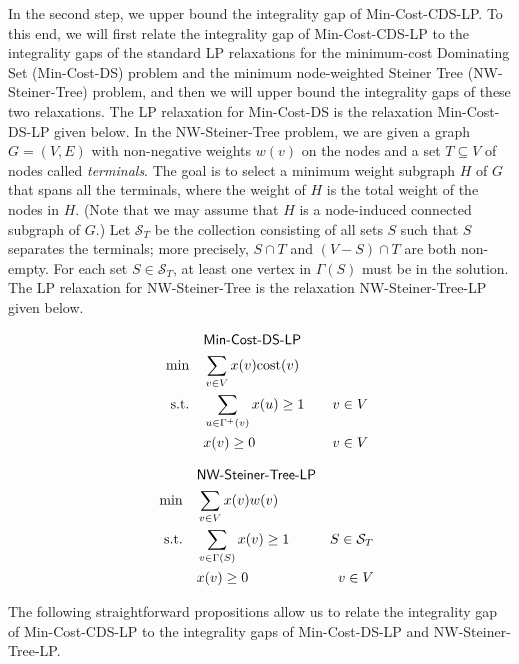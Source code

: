 \documentclass[11pt]{article}
\def\script#1{\mathcal{#1}}
\def\sS{\script{S}}
\def\prob#1{\textsf{\textup{#1}}\xspace}
\def\minDSlp{\prob{\minDS-LP}}
\def\minCDSlp{\prob{\minCDS-LP}}
\def\nwST{\prob{NW-Steiner-Tree}}
\def\nwSTlp{\prob{\nwST-LP}}
\def\minCDS{\prob{Min-Cost-CDS}}
\def\minDS{\prob{Min-Cost-DS}}
\def\cost{\mathrm{cost}}
\begin{document}
\medskip\noindent
In the second step, we upper bound the integrality gap of \minCDSlp.
To this end, we will first relate the integrality gap of \minCDSlp to
the integrality gaps of the standard LP relaxations for the
minimum-cost \prob{Dominating Set} (\minDS) problem and the minimum
node-weighted \prob{Steiner Tree} (\nwST) problem, and then we will
upper bound the integrality gaps of these two relaxations. The LP
relaxation for \minDS is the relaxation \minDSlp given below.  In the
\nwST problem, we are given a graph $G = (V, E)$ with non-negative
weights $w(v)$ on the nodes and a set $T \subseteq V$ of nodes called
\emph{terminals}. The goal is to select a minimum weight subgraph $H$
of $G$ that spans all the terminals, where the weight of $H$ is the
total weight of the nodes in $H$. (Note that we may assume that $H$
is a node-induced connected subgraph of $G$.) Let $\sS_T$ be the
collection consisting of all sets $S$ such that $S$ separates the
terminals; more precisely, $S \cap T$ and $(V - S) \cap T$ are both
non-empty.  For each set $S \in \sS_T$, at least one vertex in
$\Gamma(S)$ must be in the solution. The LP relaxation for \nwST is
the relaxation \nwSTlp given below.

\begin{center}
\begin{boxedminipage}{0.45\textwidth}
\vspace{-0.15in}
\begin{align*}
	&  \minDSlp &\\
	\quad \min \quad & \sum_{v \in V} x(v) \cost(v) &\\
	\text{s.t.} \quad & \sum_{ u \in \Gamma^+(v)} x(u) \geq 1 \quad &
	v \in V\\
	& x(v) \geq 0 & v\in V
\end{align*}
\end{boxedminipage}
\begin{boxedminipage}{0.45\textwidth}
\vspace{-0.15in}
\begin{align*}
	&  \nwSTlp &\\
	\quad \min \quad & \sum_{v \in V} x(v) w(v) &\\
	\text{s.t.} \quad & \sum_{v \in \Gamma(S)} x(v) \geq 1 \quad &
	S \in \sS_T\\
	& x(v) \geq 0 & v\in V
\end{align*}
\end{boxedminipage}
\end{center}

\noindent
The following straightforward propositions allow us to relate the
integrality gap of \minCDSlp to the integrality gaps of \minDSlp and
\nwSTlp.
\end{document}
